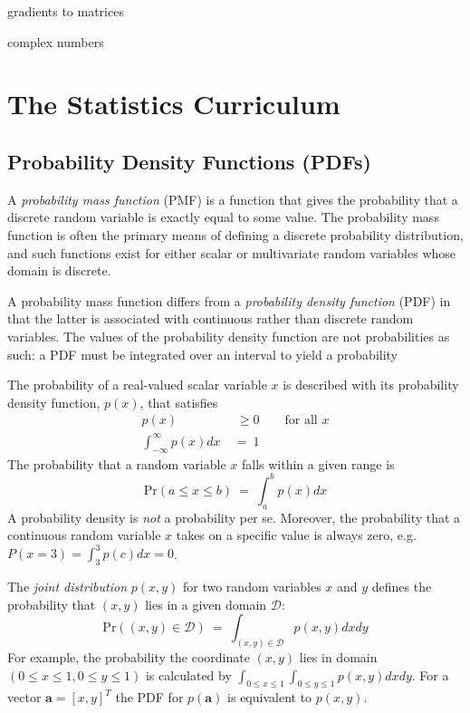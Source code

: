 \documentclass[11pt]{article}
\theoremstyle{plain}
\theoremstyle{definition}
\begin{document}
gradients to matrices

complex numbers



\section{The Statistics Curriculum}
\subsection{Probability Density Functions (PDFs)}
A \textit{probability mass function} (PMF) is a function that gives the probability that a discrete random variable is exactly equal to some value. The probability mass function is often the primary means of defining a discrete probability distribution, and such functions exist for either scalar or multivariate random variables whose domain is discrete.

A probability mass function differs from a \textit{probability density function} (PDF) in that the latter is associated with continuous rather than discrete random variables. The values of the probability density function are not probabilities as such: a PDF must be integrated over an interval to yield a probability

The probability of a real-valued scalar variable $x$ is described with its probability density function, $p(x)$, that satisfies
\begin{align}
p(x) \  & \ \geq 0 \qquad \text{for all $x$} \\
\int_{-\infty}^{\infty} p(x) dx \ &= \ 1
\end{align}
The probability that a random variable $x$ falls within a given range is
\begin{equation}
\text{Pr}(a \leq x \leq b) \ = \ \int_{a}^{b}p(x)dx
\end{equation}
A probability density is \textit{not} a probability per se. Moreover, the probability that a continuous random variable $x$ takes on a specific value is always zero, e.g. $P(x=3) = \int_3^3p(c)dx=0$.

The \textit{joint distribution} $p(x,y)$ for two random variables $x$ and $y$ defines the probability that $(x,y)$ lies in a given domain $\mathcal{D}$:
\begin{equation}
\text{Pr}((x,y) \in \mathcal{D}) \ = \ \int_{(x,y)\in \mathcal{D}} p(x,y)dxdy
\end{equation}
For example, the probability the coordinate $(x,y)$ lies in domain $(0\leq x \leq 1,0\leq y\leq 1)$ is calculated by $\int_{0\leq x \leq 1} \int_{0\leq y \leq 1}p(x,y)dxdy$. For a vector $\textbf{a} = \left[x,y\right]^T$ the PDF for $p(\textbf{a})$ is equivalent to $p(x,y)$.
\end{document}
